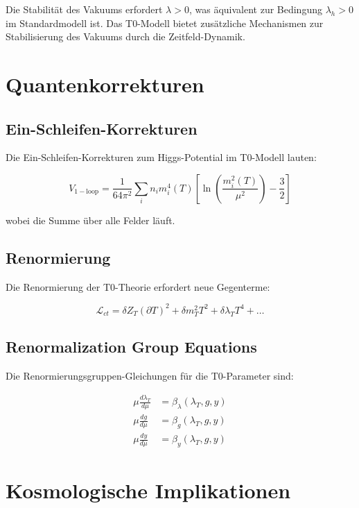 \documentclass[12pt,a4paper]{report}
\begin{document}
	Die Stabilität des Vakuums erfordert $\lambda > 0$, was äquivalent zur Bedingung $\lambda_h > 0$ im Standardmodell ist. Das T0-Modell bietet zusätzliche Mechanismen zur Stabilisierung des Vakuums durch die Zeitfeld-Dynamik.
	
	\section{Quantenkorrekturen}
	
	\subsection{Ein-Schleifen-Korrekturen}
	
	Die Ein-Schleifen-Korrekturen zum Higgs-Potential im T0-Modell lauten:
	
	\begin{equation}
		V_{1-\text{loop}} = \frac{1}{64\pi^2} \sum_i n_i m_i^4(T) \left[\ln\left(\frac{m_i^2(T)}{\mu^2}\right) - \frac{3}{2}\right]
	\end{equation}
	
	wobei die Summe über alle Felder läuft.
	
	\subsection{Renormierung}
	
	Die Renormierung der T0-Theorie erfordert neue Gegenterme:
	
	\begin{equation}
		\mathcal{L}_{ct} = \delta Z_T (\partial T)^2 + \delta m_T^2 T^2 + \delta\lambda_T T^4 + \ldots
	\end{equation}
	
	\subsection{Renormalization Group Equations}
	
	Die Renormierungsgruppen-Gleichungen für die T0-Parameter sind:
	
	\begin{align}
		\mu \frac{d\lambda_T}{d\mu} &= \beta_\lambda(\lambda_T, g, y) \\
		\mu \frac{dg}{d\mu} &= \beta_g(\lambda_T, g, y) \\
		\mu \frac{dy}{d\mu} &= \beta_y(\lambda_T, g, y)
	\end{align}
	
	\section{Kosmologische Implikationen}
	
\end{document}
